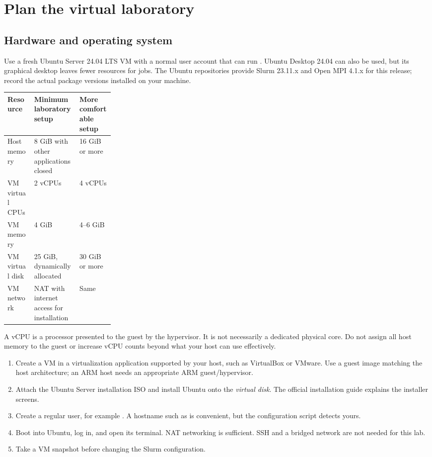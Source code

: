 \documentclass[11pt,a4paper]{article}
\newcommand{\cmd}[1]{\texttt{\detokenize{#1}}}
\begin{document}
\clearpage
\tableofcontents
\clearpage

\section{Plan the virtual laboratory}
\subsection{Hardware and operating system}
Use a fresh Ubuntu Server 24.04 LTS VM with a normal user account that can run
\cmd{sudo}. Ubuntu Desktop 24.04 can also be used, but its graphical desktop
leaves fewer resources for jobs. The Ubuntu repositories provide Slurm
23.11.x and Open MPI 4.1.x for this release; record the actual package versions
installed on your machine.\cite{ubuntu-slurm,ubuntu-mpi}

\begin{tabularx}{\linewidth}{@{}P{0.25\linewidth}YY@{}}
\toprule
Resource & Minimum laboratory setup & More comfortable setup \\
\midrule
Host memory & 8 GiB with other applications closed & 16 GiB or more \\
VM virtual CPUs & 2 vCPUs & 4 vCPUs \\
VM memory & 4 GiB & 4--6 GiB \\
VM virtual disk & 25 GiB, dynamically allocated & 30 GiB or more \\
VM network & NAT with internet access for installation & Same \\
\bottomrule
\end{tabularx}

A vCPU is a processor presented to the guest by the hypervisor. It is not
necessarily a dedicated physical core. Do not assign all host memory to the
guest or increase vCPU counts beyond what your host can use effectively.

\begin{enumerate}
\item Create a VM in a virtualization application supported by your host,
      such as VirtualBox or VMware. Use a guest image matching the host
      architecture; an ARM host needs an appropriate ARM guest/hypervisor.
\item Attach the Ubuntu Server installation ISO and install Ubuntu onto the
      \emph{virtual disk}. The official installation guide explains the
      installer screens.\cite{ubuntu-install}
\item Create a regular user, for example \cmd{student}. A hostname such as
      \cmd{hpcvm} is convenient, but the configuration script detects yours.
\item Boot into Ubuntu, log in, and open its terminal. NAT networking is
      sufficient. SSH and a bridged network are not needed for this lab.
\item Take a VM snapshot before changing the Slurm configuration.
\end{enumerate}
\end{document}
